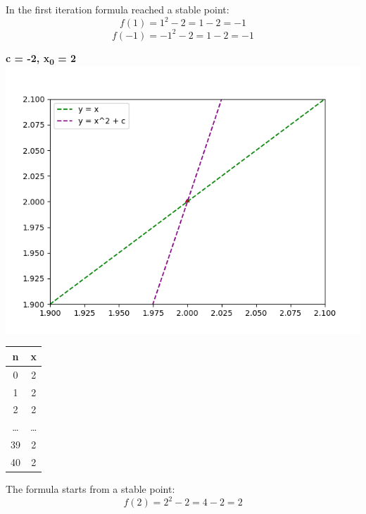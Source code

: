 \documentclass{article}
\begin{document}
In the first iteration formula reached a stable point:
\[
    f(1) = 1^{2} - 2 = 1 - 2 = -1 
\]
\[
    f(-1) = -1^{2} - 2 = 1 - 2 = -1 
\]
\newpage
\begin{center}
    \textbf{c = -2, x\textsubscript{0} = 2}
    \includegraphics[scale=0.8]{2}
    \begin{tabular}{| c | c |}
        \hline
        n & x\\
        \hline
        0 & 2\\
        1 & 2\\
        2 & 2 \\
        \dots & \dots \\
        39 & 2\\
        40 & 2\\
        \hline
    \end{tabular}
    \end{center}

The formula starts from a stable point:
\[
f(2) = 2^{2} - 2 = 4 - 2 = 2 
\]
\end{document}
